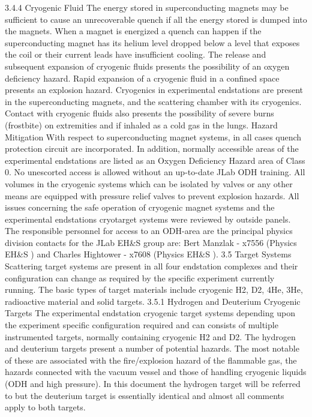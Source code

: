 {3.4.4		Cryogenic Fluid 		
	The energy stored in superconducting magnets may be sufficient to cause an unrecoverable quench if all the energy stored is dumped into the magnets. When a magnet is energized a quench can happen if the superconducting magnet has its helium level dropped below a level that exposes the coil or their current leads have insufficient cooling. The release and subsequent expansion of cryogenic fluids presents the possibility of an oxygen deficiency hazard. Rapid expansion of a cryogenic fluid in a confined space presents an explosion hazard. Cryogenics in experimental endstations are present in the superconducting magnets, and the scattering chamber with its cryogenics. Contact with cryogenic fluids also presents the possibility of severe burns (frostbite) on extremities and if inhaled as a cold gas in the lungs.
Hazard Mitigation	
	With respect to superconducting magnet systems, in all cases quench protection circuit are incorporated. In addition, normally accessible areas of the experimental endstations are listed as an Oxygen Deficiency Hazard area of Class 0. No unescorted access is allowed without an up-to-date JLab ODH training. All volumes in the cryogenic systems which can be isolated by valves or any other means are equipped with pressure relief valves to prevent explosion hazards. All issues concerning the safe operation of cryogenic magnet systems and the experimental endstations cryotarget systems were reviewed by outside panels. The responsible personnel for access to an ODH-area are the principal physics division contacts for the JLab EH\&S group are: Bert Manzlak - x7556 (Physics EH\&S ) and Charles Hightower - x7608 (Physics EH\&S ).
3.5	Target Systems
	Scattering target systems are present in all four endstation complexes and their configuration can change as required by the specific experiment currently running. The basic types of target materials include cryogenic H2, D2, 4He, 3He, radioactive material and solid targets. 
3.5.1	Hydrogen and Deuterium Cryogenic Targets
	The experimental endstation cryogenic target systems depending upon the experiment specific configuration required and can consists of multiple instrumented targets, normally containing cryogenic H2 and D2. The hydrogen and deuterium targets present a number of potential hazards. The most notable of these are associated with the fire/explosion hazard of the flammable gas, the hazards connected with the vacuum vessel and those of handling cryogenic liquids (ODH and high pressure). In this document the hydrogen target will be referred to but the deuterium target is essentially identical and almost all comments apply to both targets.
}
